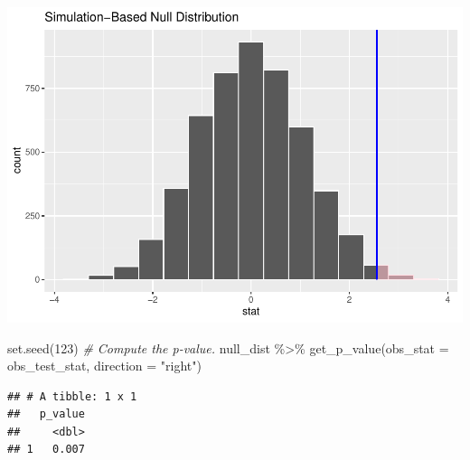 \documentclass[
]{article}
\newenvironment{Shaded}{\begin{snugshade}}{\end{snugshade}}
\newcommand{\AttributeTok}[1]{\textcolor[rgb]{0.77,0.63,0.00}{#1}}
\newcommand{\CommentTok}[1]{\textcolor[rgb]{0.56,0.35,0.01}{\textit{#1}}}
\newcommand{\DecValTok}[1]{\textcolor[rgb]{0.00,0.00,0.81}{#1}}
\newcommand{\FunctionTok}[1]{\textcolor[rgb]{0.00,0.00,0.00}{#1}}
\newcommand{\NormalTok}[1]{#1}
\newcommand{\SpecialCharTok}[1]{\textcolor[rgb]{0.00,0.00,0.00}{#1}}
\newcommand{\StringTok}[1]{\textcolor[rgb]{0.31,0.60,0.02}{#1}}
\begin{document}
\includegraphics{STAT641_Final_Report_files/figure-latex/unnamed-chunk-24-1.pdf}

\begin{Shaded}
\begin{Highlighting}[]
\FunctionTok{set.seed}\NormalTok{(}\DecValTok{123}\NormalTok{)}
\CommentTok{\# Compute the p{-}value.}
\NormalTok{null\_dist }\SpecialCharTok{\%\textgreater{}\%}
  \FunctionTok{get\_p\_value}\NormalTok{(}\AttributeTok{obs\_stat =}\NormalTok{ obs\_test\_stat, }\AttributeTok{direction =} \StringTok{"right"}\NormalTok{)}
\end{Highlighting}
\end{Shaded}

\begin{verbatim}
## # A tibble: 1 x 1
##   p_value
##     <dbl>
## 1   0.007
\end{verbatim}
\end{document}
